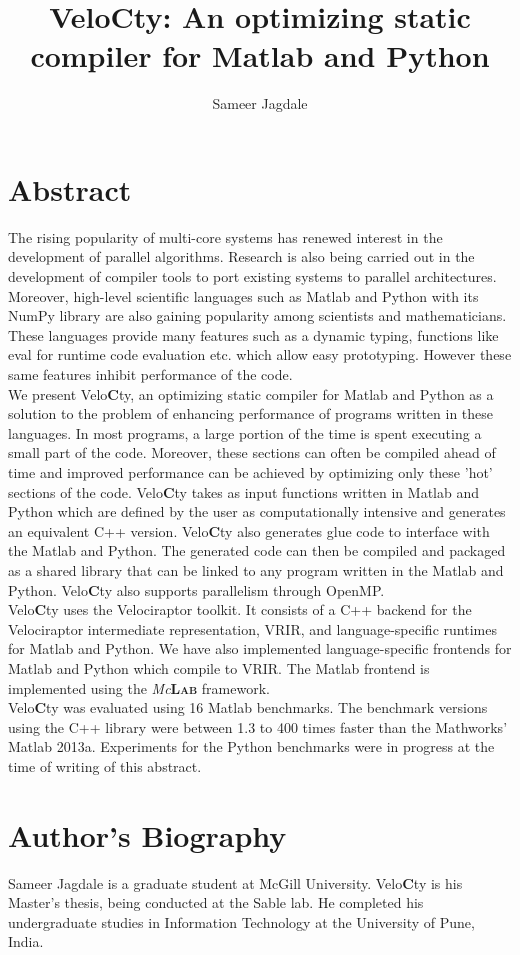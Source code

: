 \documentclass[a4paper, 12pt]{article}
\newcommand{\matlab}{{\textsc Matlab}\xspace}
\newcommand{\velocty}{{Velo\textbf{C}ty}\xspace}
\newcommand{\smclab}{\textrm{\textsl{Mc}\textbf{\textsc{Lab}}}}
\newcommand{\mclab}{\smclab\xspace}
\begin{document}
\title{\velocty : An optimizing static compiler for \matlab and Python}
\author[1]{Sameer Jagdale}
\maketitle
\section*{Abstract}
The rising popularity of multi-core systems has renewed interest in the development of parallel algorithms. Research is also being carried out in the development of compiler tools to port existing systems to parallel architectures. Moreover, high-level scientific languages such as \matlab and Python with its NumPy library are also gaining popularity among scientists and mathematicians. These languages provide many features such as a dynamic typing, functions like eval for runtime code evaluation etc. which allow easy prototyping. However these same features inhibit performance of the code. \\ 
We present \velocty, an optimizing static compiler for \matlab and Python as a solution to the problem of enhancing performance of programs written in these languages. In most programs, a large portion of the time is spent executing a small part of the code. Moreover, these sections can often be compiled ahead of time and improved performance can be achieved by optimizing only these 'hot' sections of the code. \velocty takes as input functions written in \matlab and Python which are defined by the user as computationally intensive and generates an equivalent C++ version. \velocty also generates glue code to interface with the \matlab and Python. The generated code can then be compiled and packaged as a shared library that can be linked to any program written in the \matlab and Python. \velocty also supports parallelism through OpenMP.\\
\velocty uses the Velociraptor toolkit. It consists of a C++ backend for the Velociraptor intermediate representation, VRIR, and language-specific runtimes for \matlab and Python. We have also implemented language-specific frontends for \matlab and Python which compile to VRIR. The \matlab frontend is implemented using the \mclab framework. \\
\velocty was evaluated using 16 \matlab benchmarks. The benchmark versions using the C++ library were between 1.3 to 400 times faster than the Mathworks' \matlab2013a. Experiments for the Python benchmarks were in progress at the time of writing of this abstract.
\section*{Author's Biography}
Sameer Jagdale is a graduate student at McGill University. \velocty is his Master's thesis, being conducted at the Sable lab. He completed his undergraduate studies in Information Technology at the University of Pune, India.
\end{document}
